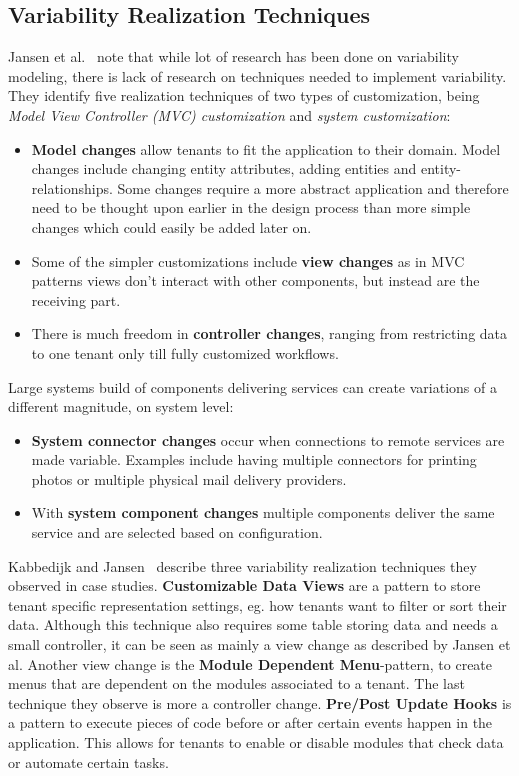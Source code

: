 \subsection{Variability Realization Techniques}
Jansen et al.~\cite{jansen2010customization} note that while lot of research has been done on variability modeling, there is lack of research on techniques needed to implement variability. They identify five realization techniques of two types of customization, being \textit{Model View Controller (MVC) customization} and \textit{system customization}:
\begin{itemize}
\item \textbf{Model changes} allow tenants to fit the application to their domain. Model changes include changing entity attributes, adding entities and entity-relationships. Some changes require a more abstract application and therefore need to be thought upon earlier in the design process than more simple changes which could easily be added later on.
\item Some of the simpler customizations include \textbf{view changes} as in MVC patterns views don't interact with other components, but instead are the receiving part.
\item There is much freedom in \textbf{controller changes}, ranging from restricting data to one tenant only till fully customized workflows.
\end{itemize}
Large systems build of components delivering services can create variations of a different magnitude, on system level:
\begin{itemize}
\item \textbf{System connector changes} occur when connections to remote services are made variable. Examples include having multiple connectors for printing photos or multiple physical mail delivery providers.
\item With \textbf{system component changes} multiple components deliver the same service and are selected based on configuration.
\end{itemize}

Kabbedijk and Jansen~\cite{kabbedijk2011variability} describe three variability realization techniques they observed in case studies. 
\textbf{Customizable Data Views} are a pattern to store tenant specific representation settings, eg. how tenants want to filter or sort their data. 
Although this technique also requires some table storing data and needs a small controller, it can be seen as mainly a view change as described by Jansen et al. 
Another view change is the \textbf{Module Dependent Menu}-pattern, to create menus that are dependent on the modules associated to a tenant. The last technique they observe is more a controller change. 
\textbf{Pre/Post Update Hooks} is a pattern to execute pieces of code before or after certain events happen in the application. 
This allows for tenants to enable or disable modules that check data or automate certain tasks.

